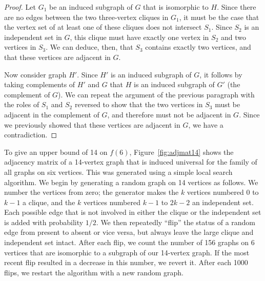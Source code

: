 \documentclass[12pt]{article}
\begin{document}
\begin{proof}
    Let $G_1$ be an induced
    subgraph of $G$ that is isomorphic to $H$.  Since there are
    no edges between the two three-vertex cliques in $G_1$, it must be the case that the
    vertex set of at least one of these cliques does not intersect $S_1$.
    Since $S_2$ is an independent set in $G$, this clique must have exactly
    one vertex in $S_2$ and two vertices in $S_3$.  We can deduce, then, that
    $S_3$ contains exactly two vertices, and that these vertices are adjacent in $G$.

    Now consider graph $H'$.  Since $H'$ is an induced subgraph of $G$, it
    follows by taking complements of $H'$ and $G$ that $H$ is an induced
    subgraph of $G'$ (the complement of $G$).  We can repeat the argument
    of the previous paragraph with the roles of $S_1$ and $S_2$ reversed to
    show that the two vertices in $S_3$ must be adjacent in the complement of
    $G$, and therefore must not be adjacent in $G$.  Since we previously showed that
    these vertices are adjacent in $G$, we have a contradiction.
\end{proof}

To give an upper bound of 14 on $f(6)$, Figure~\ref{fig:adjmat14} shows the
adjacency matrix of a 14-vertex graph that is induced universal for the family
of all graphs on six vertices.  This was generated using a simple local search
algorithm.  We begin by generating a random graph on 14 vertices as follows.
We number the vertices from zero; the generator makes the
$k$ vertices numbered $0$ to $k-1$ a clique, and the $k$ vertices numbered $k-1$ to $2k-2$ an
independent set.  Each possible edge that is not involved in either the clique
or the independent set is added with probability $1/2$.
We then repeatedly ``flip'' the status of a random edge from present to absent
or vice versa, but always leave the large clique and independent set intact.
After each flip, we count the number of 156 graphs on 6 vertices that are isomorphic
to a subgraph of our 14-vertex graph.  If the most recent flip resulted in a decrease
in this number, we revert it.  After each 1000 flips, we restart the algorithm
with a new random graph.
\end{document}
